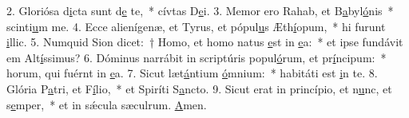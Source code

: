 2. Gloriósa d\uline{i}cta sunt d\uline{e} te,~* cívtas D\uline{e}i.
3. Memor ero Rahab, et B\uline{a}byl\uline{ó}nis~* scinti\uline{u}m me.
4. Ecce alienígenæ, et Tyrus, et pópul\uline{u}s Æth\uline{í}opum,~* hi furunt \uline{i}llic.
5. Numquid Sion dicet:~† Homo, et homo natus \uline{e}st in \uline{e}a:~* et ipse fundávit em Alt\uline{í}ssimus?
6. Dóminus narrábit in scriptúris popul\uline{ó}rum, et pr\uline{í}ncipum:~* horum, qui fuérnt in \uline{e}a.
7. Sicut læt\uline{á}ntium \uline{ó}mnium:~* habitáti est \uline{i}n te.
8. Glória P\uline{a}tri, et F\uline{í}lio,~* et Spiríti S\uline{a}ncto.
9. Sicut erat in princípio, et n\uline{u}nc, et s\uline{e}mper,~* et in sǽcula sæculrum. \uline{A}men.
